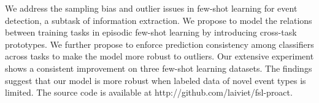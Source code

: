 We address the sampling bias and outlier issues in few-shot learning for event detection, a subtask of information extraction. We propose to model the relations between training tasks in episodic few-shot learning by introducing cross-task prototypes. We further propose to enforce prediction consistency among classifiers across tasks to make the model more robust to outliers. Our extensive experiment shows a consistent improvement on three few-shot learning datasets. The findings suggest that our model is more robust when labeled data of novel event types is limited. The source code is available at http://github.com/laiviet/fsl-proact.
